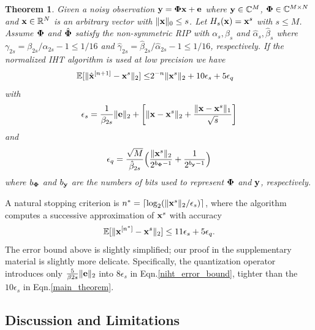 \documentclass{article}
\newtheorem{theorem}{Theorem}
\begin{document}
\begin{theorem}\label{main_theorem_TH}
Given a noisy observation ${\bf y} = {\bf \Phi x}+{\bf e} $ where ${\bf y} \in \mathbb{C}^M$, ${\bf \Phi} \in \mathbb{C}^{M\times N}$ and ${\bf x} \in \mathbb{R}^N$ is an arbitrary vector with $\|{\bf x} \|_0 \leq s$. Let $H_s({\bf x}) = {\bf x}^s$ with $s\leq M$. Assume ${\bf \Phi}$ and $\hat{\bf \Phi}$ satisfy the non-symmetric RIP with ${\alpha}_s, {\beta}_s$ and $\hat{\alpha}_s, \hat{\beta}_s$ where ${\gamma}_{2s} = {\beta}_{2s}/{\alpha}_{2s} -1 \leq 1/16$ and $\hat{\gamma}_{2s} = \hat{\beta}_{2s}/\hat{\alpha}_{2s} -1 \leq 1/16$, respectively. If the normalized IHT algorithm is used at low precision we have
\begin{equation}\label{main_theorem}
\begin{split}
        \mathbb{E}[\|\hat{{\bf x}}^{[n+1]}-{\bf x}^s\|_2]  
        \leq &2^{-n}\|{\bf x}^{s}\|_2  + 10 {\epsilon}_s + 5 {\epsilon}_q
\end{split}
\end{equation}
with 
\begin{equation}
 {\epsilon}_s = \frac{1}{\beta_{2s}}\|{\bf e} \|_2 +\bigg  [ \|{\bf x}-{\bf x}^s \|_2 + \frac{\|{\bf x}-{\bf x}^s \|_1}{\sqrt{s}}\bigg]    
\end{equation}
and
\begin{equation}
 {\epsilon}_q = \frac{\sqrt{M}}{\hat{\beta}_{2s}}\Big ( \frac{\| {\bf x}^s\|_2}{2^{b_{\bf \Phi}-1}}+\frac{1}{2^{b_{\bf y}-1}} \Big )
\end{equation}
where $b_{\bf \Phi}$ and $b_{\bf y}$ are the numbers of bits used to represent ${\bf \Phi}$ and ${\bf y}$, respectively.
\end{theorem}
A natural stopping criterion is $n^* = \lceil \log_2 (\|{\bf x}^s \|_2/\epsilon_s)\rceil$, where the algorithm computes a successive approximation of ${\bf x}^s$ with accuracy
\begin{equation}
    \mathbb{E}[\|{\bf x}^{[n^*]}-{\bf x}^s \|_2] \leq 11\epsilon_s + 5\epsilon_q.
\end{equation}
The error bound above is slightly simplified; our proof in the supplementary material is slightly more delicate. Specifically, the quantization operator introduces only $\frac{5}{\beta
{2s}} \|{\bf e} \|_2$ into $8 {\epsilon}_s$ in Eqn.\ref{niht_error_bound}, tighter than the $10 {\epsilon}_s$ in Eqn.\ref{main_theorem}.

\subsection{Discussion and Limitations}
\end{document}
